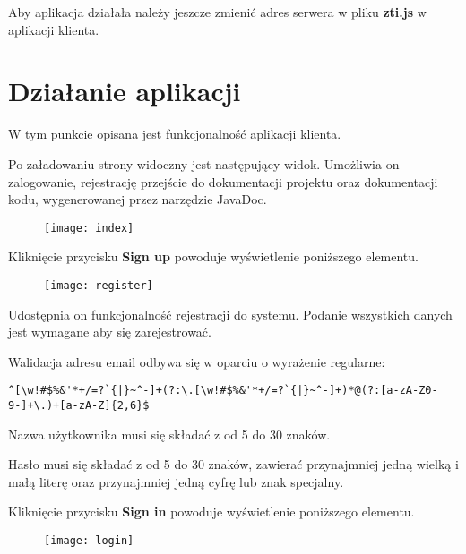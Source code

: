\documentclass[11pt, titlepage]{article}
\begin{document}
Aby aplikacja działała należy jeszcze zmienić adres serwera w pliku \textbf{zti.js} w aplikacji klienta.

\break

\section{Działanie aplikacji}
\hspace{11pt} W tym punkcie opisana jest funkcjonalność aplikacji klienta. 

Po załadowaniu strony widoczny jest następujący widok. Umożliwia on zalogowanie, rejestrację przejście do dokumentacji projektu oraz dokumentacji kodu, wygenerowanej przez narzędzie JavaDoc.

\begin{figure}[H]
\begin{adjustwidth}{-3cm}{}
\texttt{[image: index]}
\end{adjustwidth}
\end{figure}

Kliknięcie przycisku \textbf{Sign up} powoduje wyświetlenie poniższego elementu.

\begin{figure}[H]
\texttt{[image: register]}
\end{figure}

Udostępnia on funkcjonalność rejestracji do systemu. Podanie wszystkich danych jest wymagane aby się zarejestrować.

Walidacja adresu email odbywa się w oparciu o wyrażenie regularne:
\begin{adjustwidth}{-4cm}{}
\begin{lstlisting}
^[\w!#$%&'*+/=?`{|}~^-]+(?:\.[\w!#$%&'*+/=?`{|}~^-]+)*@(?:[a-zA-Z0-9-]+\.)+[a-zA-Z]{2,6}$
\end{lstlisting}
\end{adjustwidth}

Nazwa użytkownika musi się składać z od 5 do 30 znaków.

Hasło musi się składać z od 5 do 30 znaków, zawierać przynajmniej jedną wielką i małą literę oraz przynajmniej jedną cyfrę lub znak specjalny.

\break

Kliknięcie przycisku \textbf{Sign in} powoduje wyświetlenie poniższego elementu.

\begin{figure}[H]
\texttt{[image: login]}
\end{figure}
\end{document}
